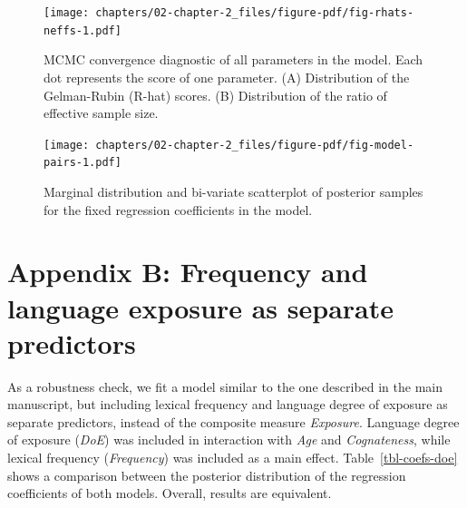 \documentclass[
  12pt,
  b5paperpaper,
  twoside]{scrreprt}
\newcommand{\blandscape}{\begin{landscape}}
\newcommand{\elandscape}{\end{landscape}}
\begin{document}
\newpage

\blandscape

\begin{figure}

{\centering \texttt{[image: chapters/02-chapter-2\_files/figure-pdf/fig-rhats-neffs-1.pdf]}

}

\caption{\label{fig-rhats-neffs}MCMC convergence diagnostic of all
parameters in the model. Each dot represents the score of one parameter.
(A) Distribution of the Gelman-Rubin (R-hat) scores. (B) Distribution of
the ratio of effective sample size.}

\end{figure}

\elandscape

\newpage

\blandscape

\begin{figure}

{\centering \texttt{[image: chapters/02-chapter-2\_files/figure-pdf/fig-model-pairs-1.pdf]}

}

\caption{\label{fig-model-pairs}Marginal distribution and bi-variate
scatterplot of posterior samples for the fixed regression coefficients
in the model.}

\end{figure}

\elandscape

\newpage{}

\hypertarget{appendix-b-frequency-and-language-exposure-as-separate-predictors}{%
\section{Appendix B: Frequency and language exposure as separate
predictors}\label{appendix-b-frequency-and-language-exposure-as-separate-predictors}}

As a robustness check, we fit a model similar to the one described in
the main manuscript, but including lexical frequency and language degree
of exposure as separate predictors, instead of the composite measure
\emph{Exposure}. Language degree of exposure (\emph{DoE}) was included
in interaction with \emph{Age} and \emph{Cognateness}, while lexical
frequency (\emph{Frequency}) was included as a main effect.
Table~\ref{tbl-coefs-doe} shows a comparison between the posterior
distribution of the regression coefficients of both models. Overall,
results are equivalent. \newpage
\end{document}
